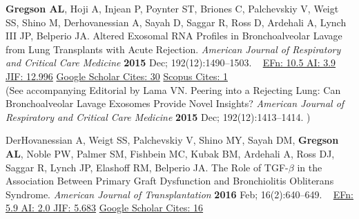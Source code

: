 \documentclass[letterpaper,10pt,sans,dvipsnames,final]{moderncv}%
\begin{document}
\begin{thebibliography}{1}
  \bibitem[28]{} \textbf{Gregson AL}, Hoji A, Injean P, Poynter ST, Briones C, Palchevskiy V, Weigt SS, Shino M, Derhovanessian A, Sayah D, Saggar R, Ross D, Ardehali A, Lynch III JP, Belperio JA. Altered Exosomal RNA Profiles in Bronchoalveolar Lavage from Lung Transplants with Acute Rejection. {\color{BrickRed}\textit{American Journal of Respiratory and Critical Care Medicine}} \textbf{2015} Dec; 192(12):1490--1503. \href{http://www.atsjournals.org/doi/abs/10.1164/rccm.201503-0558OC#.VeDm8JWW25M}{\aiDoi}~ 
    {\color{NavyBlue}\href{http://www.eigenfactor.org/rankings.php?bsearch=AMERICAN+JOURNAL+OF+RESPIRATORY+AND+CRITICAL+CARE+MEDICINE&searchby=journal&orderby=eigenfactor}{{\smaller EFn: 10.5 AI: 3.9}}
      \href{http://admin-apps.webofknowledge.com/JCR/JCR?RQ=RECORD&rank=1&journal=AM+J+RESP+CRIT+CARE}{{\smaller JIF: 12.996}}
      \href{https://scholar.google.com/scholar?oi=bibs&hl=en&cites=8009839804536388683}{{\smaller Google Scholar Cites: 30}}
      \href{http://www.scopus.com/record/display.uri?eid=2-s2.0-84951933250&origin=resultslist&sort=plf-f&src=s&st1=gregson+&st2=&sid=A253098209782A207E8DEF555629A3D6.iqs8TDG0Wy6BURhzD3nFA%3a90&sot=b&sdt=b&sl=19&s=FIRSTAUTH%28gregson+%29&relpos=0&citeCnt=1&searchTerm=FIRSTAUTH%28gregson+%29}{{\smaller Scopus Cites: 1}}
    }~ 
    \\(See accompanying Editorial by Lama VN. Peering into a Rejecting Lung: Can Bronchoalveolar Lavage Exosomes Provide Novel Insights? {\color{BrickRed}\textit{American Journal of Respiratory and Critical Care Medicine}} \textbf{2015} Dec; 192(12):1413--1414. \href{http://www.atsjournals.org/doi/abs/10.1164/rccm.201509-1799ED}{\aiDoi})

  \bibitem[29]{} DerHovanessian A, Weigt SS, Palchevskiy V, Shino MY, Sayah DM, \textbf{Gregson AL}, Noble PW, Palmer SM, Fishbein MC, Kubak BM, Ardehali A, Ross DJ, Saggar R, Lynch JP, Elashoff RM, Belperio JA. The Role of {\smaller TGF}-$\beta$ in the Association Between Primary Graft Dysfunction and Bronchiolitis Obliterans Syndrome. {\color{BrickRed}\textit{American Journal of Transplantation}} \textbf{2016} Feb; 16(2):640--649. \href{http://onlinelibrary.wiley.com/doi/10.1111/ajt.13475/abstract}{\aiDoi}~
    {\color{NavyBlue}\href{http://52.6.43.8/projects/journalRank/rankings.php?bsearch=AMERICAN+JOURNAL+OF+TRANSPLANTATION&searchby=journal&orderby=eigenfactor}{{\smaller EFn: 5.9 AI: 2.0 JIF: 5.683}}
      \href{}{{\smaller Google Scholar Cites: 16}}
       }


\end{thebibliography}
\end{document}
